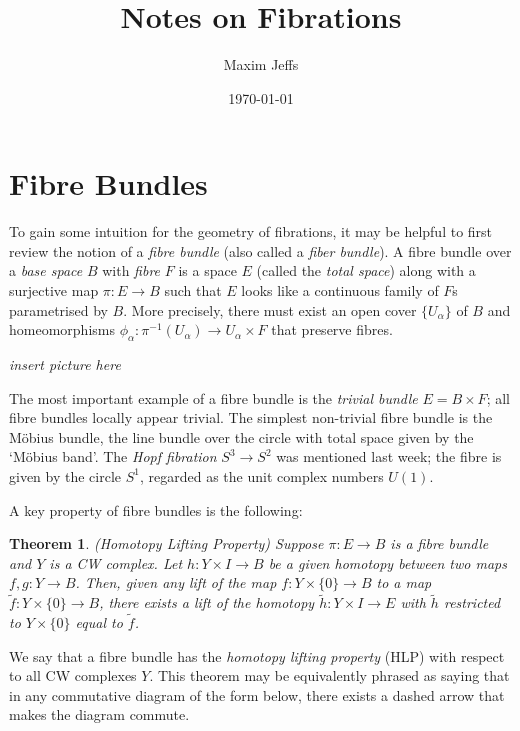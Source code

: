 \documentclass[11pt]{article}
\title{Notes on Fibrations}
\author{Maxim Jeffs}
\date{\today}
\newtheorem{theorem}{Theorem}
\begin{document}
\maketitle

\section*{Fibre Bundles}

To gain some intuition for the geometry of fibrations, it may be helpful to first review the notion of a \textit{fibre bundle} (also called a \textit{fiber bundle}). A fibre bundle over a \textit{base space} $B$ with \textit{fibre} $F$ is a space $E$ (called the \textit{total space}) along with a surjective map $\pi: E \to B$ such that $E$ looks like a continuous family of $F$s parametrised by $B$. More precisely, there must exist an open cover $\{U_{\alpha}\}$ of $B$ and homeomorphisms $\phi_{\alpha} : \pi^{-1}(U_{\alpha}) \to U_{\alpha} \times F$ that preserve fibres. 

\begin{center}
\textit{insert picture here}
\end{center}

The most important example of a fibre bundle is the \textit{trivial bundle} $E = B \times F$; all fibre bundles locally appear trivial. The simplest non-trivial fibre bundle is the M\"obius bundle, the line bundle over the circle with total space given by the `M\"obius band'. The \textit{Hopf fibration} $S^3 \to S^2$ was mentioned last week; the fibre is given by the circle $S^1$, regarded as the unit complex numbers $U(1)$.

A key property of fibre bundles is the following:

\begin{theorem} 
(Homotopy Lifting Property) Suppose $\pi: E \to B$ is a fibre bundle and $Y$ is a CW complex. Let $h: Y \times I \to B$ be a given homotopy between two maps $f,g: Y \to B$. Then, given any lift of the map $f: Y \times \{0\} \to B$ to a map $\tilde{f}: Y \times \{0\} \to B$, there exists a lift of the homotopy $\tilde{h}: Y \times I \to E$ with $\tilde{h}$ restricted to $Y \times \{0\}$ equal to $\tilde{f}$. 
\end{theorem}
We say that a fibre bundle has the \textit{homotopy lifting property} (HLP) with respect to all CW complexes $Y$. This theorem may be equivalently phrased as saying that in any commutative diagram of the form below, there exists a dashed arrow that makes the diagram commute.
\begin{center}
\end{center}
\end{document}
